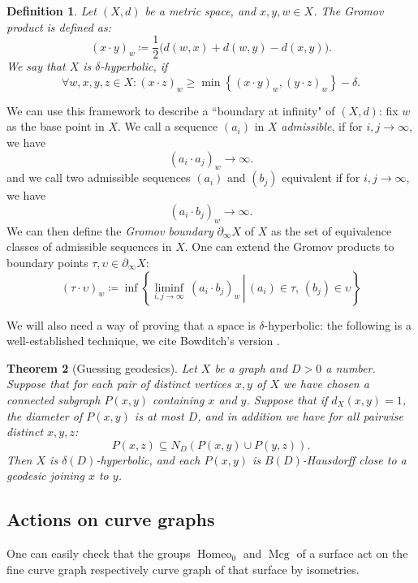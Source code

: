 \documentclass[a4paper]{article}
\newtheorem{theorem}{Theorem}[section]
\newtheorem{definition}[theorem]{Definition}
\begin{document}
\begin{definition}
Let $(X,d)$ be a metric space, and $x,y,w\in X$.
The \emph{Gromov product} is defined as:
\begin{equation*}
    ( x\cdot y)_w \coloneqq \frac{1}{2}\big( d(w,x) + d(w,y) - d(x,y)  \big).
\end{equation*}
We say that $X$ is $\delta$-hyperbolic, if 
\[\forall w,x,y,z \in X\colon ( x\cdot z )_w \geq \min\left\{ ( x\cdot y)_w, (y\cdot z)_w \right\} - \delta.\]
\end{definition}

We can use this framework to describe a ``boundary at infinity" of $(X,d)$:
fix $w$ as the base point in $X$.
We call a sequence $(a_i)$ in $X$ \emph{admissible}, if for $i,j \rightarrow \infty$, we have
\[(a_i\cdot a_j)_w \rightarrow \infty.\]
and we call two admissible sequences $(a_i)$ and $(b_j)$ equivalent if for $i,j\rightarrow \infty$, we have
\[(a_i\cdot b_j)_w \rightarrow \infty.\]
We can then define the \emph{Gromov boundary} $\partial_\infty X$ of $X$ as the set of equivalence classes of admissible sequences in $X$.
One can extend the Gromov products to boundary points $\tau, \upsilon \in \partial_\infty X$:
\[(\tau\cdot \upsilon)_w \coloneqq \inf \left\{\left. \liminf_{i,j\rightarrow \infty}\, (a_i\cdot b_j)_w \,\right|\, (a_i)\in \tau,\, (b_j)\in \upsilon \right\}\]

We will also need a way of proving that a space is $\delta$-hyperbolic:
the following is a well-established technique, we cite Bowditch's version \cite{Bowditch_unif-hyp}.

\begin{theorem}[Guessing geodesics]\label{thm:bowditch-guessing-geodesics}
    Let $X$ be a graph and $D>0$ a number.
    Suppose that for each pair of distinct vertices $x,y$ of $X$ we have chosen a connected subgraph $P(x,y)$ containing $x$ and $y$.
    Suppose that if $d_X(x,y) = 1$, the diameter of $P(x,y)$ is at most $D$, and in addition we have for all pairwise distinct $x,y,z$:
    \[ P(x,z) \subseteq N_D(P(x,y)\cup P(y,z)). \]
    Then $X$ is $\delta(D)$-hyperbolic, and each $P(x,y)$ is $B(D)$-Hausdorff close to a geodesic joining $x$ to $y$.
\end{theorem}

\subsection{Actions on curve graphs}\label{subsec:actions-on-cg}
One can easily check that the groups $\operatorname{Homeo}_0$ and $\operatorname{Mcg}$ of a surface act on the fine curve graph respectively curve graph of that surface by isometries.
\end{document}
